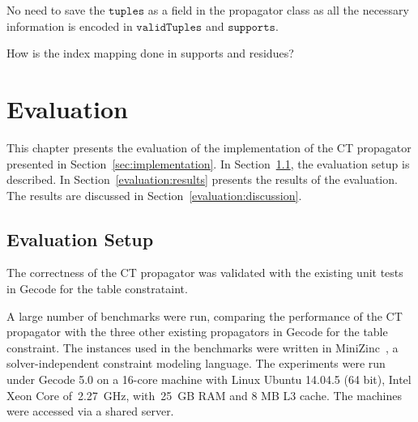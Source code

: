 \documentclass[a4paper,11pt]{article}
\newcommand{\T}[1]{\texttt{#1}}
\newcommand{\Todo}[1]{{\color{blue}#1}}
\newcommand{\Secref}[1]{Section~\ref{#1}}
\newcommand{\Chapref}[1]{Section~\ref{#1}}
\newcommand{\CurrTable}{\texttt{validTuples}}
\newcommand{\Supports}{\texttt{supports}}
\numberwithin{equation}{section}
\begin{document}
No need to save the $\T{tuples}$ as a field in the propagator class as all
the necessary information is encoded in $\CurrTable$ and $\Supports$.

\Todo{How is the index mapping done in supports and residues?}









\section{Evaluation}
\label{evaluation}
This chapter presents the evaluation of the implementation of the CT propagator
presented in \Chapref{sec:implementation}. In \Secref{evaluation:setup},
the evaluation setup is described. In \Secref{evaluation:results} presents
the results of the evaluation. The results are discussed in \Secref{evaluation:discussion}.


\subsection{Evaluation Setup}
\label{evaluation:setup}
The correctness of the CT propagator was validated with the existing unit tests
in Gecode for the table constrataint.

A large number of benchmarks were run, comparing the performance of the CT propagator
with the three other existing propagators in Gecode for the table constraint.
The instances used in the benchmarks were written in MiniZinc~\cite{MiniZinc},
a solver-independent constraint modeling language. The experiments were run
under Gecode 5.0 on a 16-core machine with Linux Ubuntu 14.04.5 (64 bit),
Intel Xeon Core of~2.27~GHz, with~25~GB RAM and 8 MB L3 cache. The machines
were accessed via a shared server.
\end{document}
